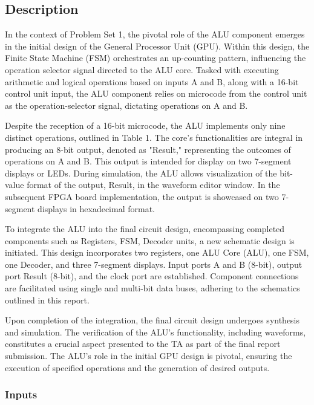
\subsection{{Description}}

    {In the context of Problem Set 1, the pivotal role of the ALU component emerges in the initial design of the General Processor Unit (GPU). Within this design, the Finite State Machine (FSM) orchestrates an up-counting pattern, influencing the operation selector signal directed to the ALU core. Tasked with executing arithmetic and logical operations based on inputs A and B, along with a 16-bit control unit input, the ALU component relies on microcode from the control unit as the operation-selector signal, dictating operations on A and B.}

    {Despite the reception of a 16-bit microcode, the ALU implements only nine distinct operations, outlined in Table 1. The core's functionalities are integral in producing an 8-bit output, denoted as "Result," representing the outcomes of operations on A and B. This output is intended for display on two 7-segment displays or LEDs. During simulation, the ALU allows visualization of the bit-value format of the output, Result, in the waveform editor window. In the subsequent FPGA board implementation, the output is showcased on two 7-segment displays in hexadecimal format.}
    
    {To integrate the ALU into the final circuit design, encompassing completed components such as Registers, FSM, Decoder units, a new schematic design is initiated. This design incorporates two registers, one ALU Core (ALU), one FSM, one Decoder, and three 7-segment displays. Input ports A and B (8-bit), output port Result (8-bit), and the clock port are established. Component connections are facilitated using single and multi-bit data buses, adhering to the schematics outlined in this report.}
    
    {Upon completion of the integration, the final circuit design undergoes synthesis and simulation. The verification of the ALU's functionality, including waveforms, constitutes a crucial aspect presented to the TA as part of the final report submission. The ALU's role in the initial GPU design is pivotal, ensuring the execution of specified operations and the generation of desired outputs.}

    \subsubsection{{Inputs}}

